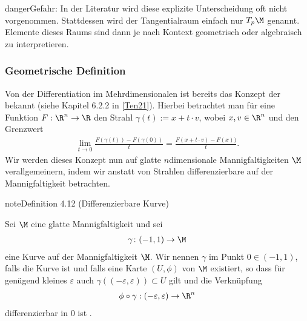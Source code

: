 \documentclass[letterpaper,10pt,german]{jupyterBook}
\begin{document}
\begin{sphinxadmonition}{danger}{Gefahr:}
\sphinxAtStartPar
In der Literatur wird diese explizite Unterscheidung oft nicht vorgenommen.
Stattdessen wird der Tangentialraum einfach nur \(T_p\M\) genannt.
Elemente dieses Raums sind dann je nach Kontext geometrisch oder algebraisch zu interpretieren.
\end{sphinxadmonition}


\subsubsection{Geometrische Definition}
\label{\detokenize{manifolds/tangential:geometrische-definition}}
\sphinxAtStartPar
Von der Differentiation im Mehrdimensionalen ist bereits das Konzept der  bekannt (siehe Kapitel 6.2.2 in {[}\hyperlink{cite.references:id15}{Ten21}{]}).
Hierbei betrachtet man für eine Funktion \(F:\R^n\to\R\) den Strahl \(\gamma(t):= x + t\cdot v\), wobei \(x,v\in\R^n\) und den Grenzwert
\begin{equation*}
\begin{split}\lim_{t\to 0} \frac{F(\gamma(t)) - F(\gamma(0))}{t} = \frac{F(x + t\cdot v) - F(x))}{t}.\end{split}
\end{equation*}
\sphinxAtStartPar
Wir werden dieses Konzept nun auf glatte \(n\)\sphinxhyphen{}dimensionale Mannigfaltigkeiten \(\M\) verallgemeinern, indem wir anstatt von Strahlen differenzierbare  auf der Mannigfaltigkeit betrachten.
\label{manifolds/tangential:definition-1}
\begin{sphinxadmonition}{note}{Definition 4.12 (Differenzierbare Kurve)}



\sphinxAtStartPar
Sei \(\M\) eine glatte Mannigfaltigkeit und sei
\begin{equation*}
\begin{split}\gamma \colon (-1,1) \rightarrow \M\end{split}
\end{equation*}
\sphinxAtStartPar
eine Kurve auf der Mannigfaltigkeit \(\M\).
Wir nennen \(\gamma\)  im Punkt \(0\in(-1,1)\), falls die Kurve  ist und falls eine Karte \((U,\phi)\) von \(\M\) existiert, so dass für genügend kleines \(\varepsilon\) auch \(\gamma((-\varepsilon,\varepsilon))\subset U\) gilt und die Verknüpfung
\begin{equation*}
\begin{split}\phi \circ \gamma:(-\varepsilon,\varepsilon)\to\R^n\end{split}
\end{equation*}
\sphinxAtStartPar
differenzierbar in \(0\) ist .
\end{sphinxadmonition}
\end{document}
